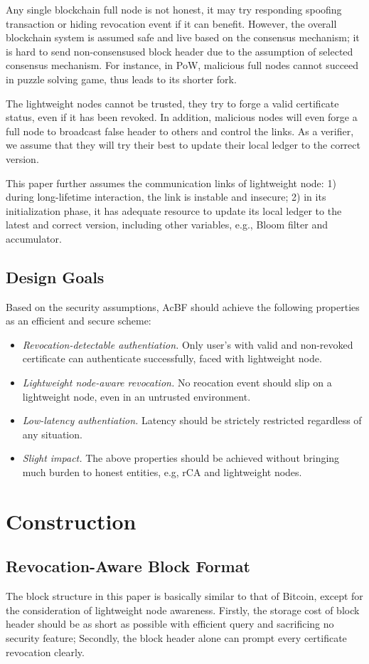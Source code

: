 \documentclass[conference]{IEEEtran}
\begin{document}
Any single blockchain full node is not honest, it may try responding spoofing transaction or hiding revocation event if it can benefit. However, the overall blockchain system is assumed safe and live based on the consensus mechanism; it is hard to send non-consensused block header due to the assumption of selected consensus mechanism. For instance, in PoW, malicious full nodes cannot succeed in puzzle solving game, thus leads to its shorter fork.

The lightweight nodes cannot be trusted, they try to forge a valid certificate status, even if it has been revoked. In addition, malicious nodes will even forge a full node to broadcast false header to others and control the links. As a verifier, we assume that they will try their best to update their local ledger to the correct version. 

This paper further assumes the communication links of lightweight node: 1) during long-lifetime interaction, the link is instable and insecure; 2) in its initialization phase, it has adequate resource to update its local ledger to the latest and correct version, including other variables, e.g., Bloom filter and accumulator.

\subsection{Design Goals}
Based on the security assumptions, AcBF should achieve the following properties as an efficient and secure scheme:  
\begin{itemize}
	\item \textit{Revocation-detectable authentiation.} Only user's with valid and non-revoked certificate can authenticate successfully, faced with lightweight node.
	\item \textit{Lightweight node-aware revocation.} No reocation event should slip on a lightweight node, even in an untrusted environment. 
	\item \textit{Low-latency authentiation.} Latency should be strictely restricted regardless of any situation. 
	\item \textit{Slight impact.} The above properties should be achieved without bringing much burden to honest entities, e.g, rCA and lightweight nodes.
\end{itemize}
\section{Construction}\label{sec:construction}
\subsection{Revocation-Aware Block Format}
\label{sec:format}
The block structure in this paper is basically similar to that of Bitcoin, except for the consideration of lightweight node awareness. Firstly, the storage cost of block header should be as short as possible with efficient query and sacrificing no security feature; Secondly, the block header alone can prompt every certificate revocation clearly. 
\end{document}

